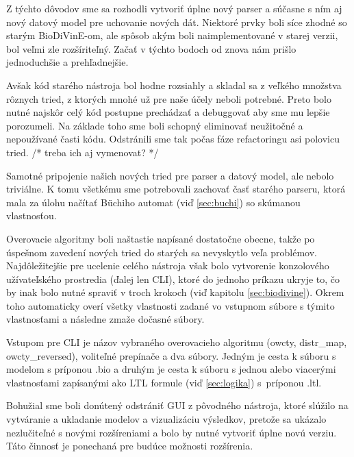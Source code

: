 \documentclass[11pt,final,oneside]{fithesis}
\begin{document}
Z t\'ychto d\^ ovodov sme sa rozhodli vytvori\v t \'uplne nov\'y parser a s\'u\v casne s n\'im aj nov\'y datov\'y model pre uchovanie nov\'ych d\'at. Niektor\'e
prvky boli s\'ice zhodn\'e so star\'ym BioDiVinE-om, ale sp\^ osob ak\'ym boli naimplementovan\'e v starej verzii, bol ve\v lmi zle roz\v s\'irite\v ln\'y. 
Za\v ca\v t v t\'ychto bodoch od znova n\'am pri\v slo jednoduch\v sie a preh\v ladnej\v sie. 

Av\v sak k\'od star\'eho n\'astroja bol hodne rozsiahly a skladal
sa z ve\v lk\'eho mno\v zstva r\^ oznych tried, z ktor\'ych mnoh\'e u\v z pre na\v se \'u\v cely neboli potrebn\'e. Preto bolo nutn\'e najsk\^ or cel\'y k\'od
postupne prech\'adza\v t a debuggova\v t aby sme mu lep\v sie porozumeli. Na z\'aklade toho sme boli schopn\'y eliminova\v t neu\v zito\v cn\'e a 
nepou\v z\'ivan\'e \v casti k\'odu. Odstr\'anili sme tak po\v cas f\'aze refactoringu asi polovicu tried.
/* treba ich aj vymenovat? */

Samotn\'e pripojenie na\v sich nov\'ych tried pre parser a datov\'y model, ale nebolo trivi\'alne. K tomu v\v setk\'emu sme 
potrebovali zachova\v t \v cas\v t star\'eho parseru, ktor\'a mala za \'ulohu na\v c\'ita\v t B\"uchiho automat (vi\v d \ref{sec:buchi}) so sk\'umanou 
vlastnos\v tou.

Overovacie algoritmy boli na\v stastie nap\'isan\'e dostato\v cne obecne, tak\v ze po \'uspe\v snom zaveden\'i nov\'ych tried do star\'ych sa nevyskytlo ve\v la 
probl\'emov. Najd\^ ole\v zitej\v sie pre ucelenie cel\'eho n\'astroja v\v sak bolo vytvorenie konzolov\'eho u\v z\'ivate\v lsk\'eho prostredia (\v dalej len 
CLI), ktor\'e do jednoho pr\'ikazu ukryje to, \v co by inak bolo nutn\'e spravi\v t v troch krokoch (vi\v d kapitolu \ref{sec:biodivine}). Okrem toho automaticky over\'i v\v setky vlastnosti 
zadan\'e vo vstupnom s\'ubore s t\'ymito vlastnos\v tami a n\'asledne zma\v ze do\v casn\'e s\'ubory. 

Vstupom pre CLI je n\'azov vybran\'eho overovacieho algoritmu (owcty, distr\_map, owcty\_reversed), volite\v ln\'e prep\'ina\v ce a dva s\'ubory. Jedn\'ym 
je cesta k s\'uboru s modelom s pr\'iponou .bio a druh\'ym je cesta k s\'uboru s jednou alebo viacer\'ymi vlastnos\v tami zap\'isan\'ymi ako LTL formule 
(vi\v d \ref{sec:logika}) s~pr\'iponou .ltl. 

Bohu\v zial sme boli don\'uten\'y odstr\'ani\v t GUI z p\^ ovodn\'eho n\'astroja, ktor\'e sl\'u\v zilo na vytv\'aranie a ukladanie modelov a vizualiz\'aciu v\'ysledkov, 
preto\v ze sa uk\'azalo nezlu\v cite\v ln\'e s nov\'ymi roz\v s\'ireniami a bolo by  nutn\'e vytvori\v t \'uplne nov\'u verziu. T\'ato \v cinnos\v t je 
ponechan\'a pre bud\'uce mo\v znosti roz\v s\'irenia.
\end{document}
